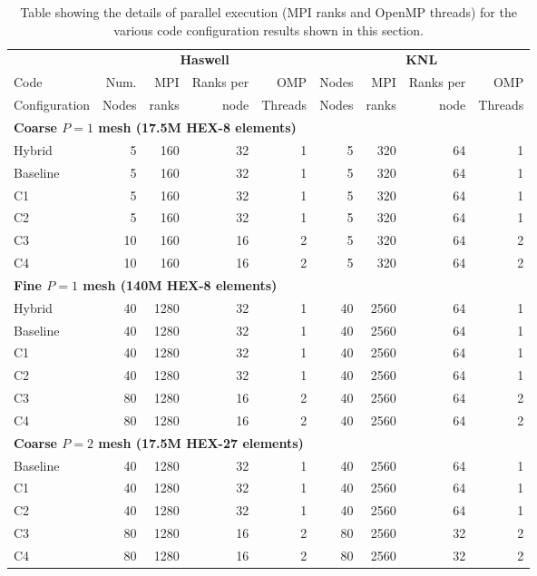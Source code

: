 \begin{table}[!htb]
  \centering
  \caption{Table showing the details of parallel execution (MPI ranks and OpenMP
    threads) for the various code configuration results shown in this section.}
  \label{tab:run_conf}
  \begin{tabular}{l||r|r|r|r|r|r|r|r}
    \hline\hline
     & \multicolumn{4}{c|}{\textbf{Haswell}} & \multicolumn{4}{c}{\textbf{KNL}} \\ [0.5em]
    Code & Num. & MPI & Ranks per & OMP & Nodes & MPI & Ranks per & OMP \\
    Configuration & Nodes & ranks & node & Threads & Nodes & ranks & node & Threads\\ [1em]
    \multicolumn{8}{l}{\textbf{Coarse $P=1$ mesh (17.5M HEX-8 elements)}} \\
    \hline
    Hybrid & 5 & 160 & 32 & 1 & 5 & 320 & 64 & 1\\
    Baseline & 5 & 160 & 32 & 1 & 5 & 320 & 64 & 1\\
    C1 & 5 & 160 & 32 & 1 & 5 & 320 & 64 & 1\\
    C2 & 5 & 160 & 32 & 1 & 5 & 320 & 64 & 1\\
    C3 & 10 & 160 & 16 & 2 & 5 & 320 & 64 & 2\\
    C4 & 10 & 160 & 16 & 2 & 5 & 320 & 64 & 2\\ [1em]
    \multicolumn{8}{l}{\textbf{Fine $P=1$ mesh (140M HEX-8 elements)}} \\
    \hline
    Hybrid & 40 & 1280 & 32 & 1 & 40 & 2560 & 64 & 1\\
    Baseline & 40 & 1280 & 32 & 1 & 40 & 2560 & 64 & 1\\
    C1 & 40 & 1280 & 32 & 1 & 40 & 2560 & 64 & 1\\
    C2 & 40 & 1280 & 32 & 1 & 40 & 2560 & 64 & 1\\
    C3 & 80 & 1280 & 16 & 2 & 40 & 2560 & 64 & 2\\
    C4 & 80 & 1280 & 16 & 2 & 40 & 2560 & 64 & 2\\ [1em]
    \multicolumn{8}{l}{\textbf{Coarse $P=2$ mesh (17.5M HEX-27 elements)}} \\
    \hline
    Baseline & 40 & 1280 & 32 & 1 & 40 & 2560 & 64 & 1\\
    C1 & 40 & 1280 & 32 & 1 & 40 & 2560 & 64 & 1\\
    C2 & 40 & 1280 & 32 & 1 & 40 & 2560 & 64 & 1\\
    C3 & 80 & 1280 & 16 & 2 & 80 & 2560 & 32 & 2\\
    C4 & 80 & 1280 & 16 & 2 & 80 & 2560 & 32 & 2\\
    \hline\hline
  \end{tabular}
\end{table}

